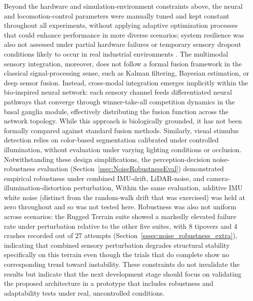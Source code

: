 Beyond the hardware and simulation-environment constraints above, the neural and locomotion-control parameters were manually tuned and kept constant throughout all experiments, without applying adaptive optimization processes that could enhance performance in more diverse scenarios; system resilience was also not assessed under partial hardware failures or temporary sensory dropout conditions likely to occur in real industrial environments . The multimodal sensory integration, moreover, does not follow a formal fusion framework in the classical signal-processing sense, such as Kalman filtering, Bayesian estimation, or deep sensor fusion. Instead, cross-modal integration emerges implicitly within the bio-inspired neural network: each sensory channel feeds differentiated neural pathways that converge through winner-take-all competition dynamics in the basal ganglia module, effectively distributing the fusion function across the network topology. While this approach is biologically grounded, it has not been formally compared against standard fusion methods. Similarly, visual stimulus detection relies on color-based segmentation calibrated under controlled illumination, without evaluation under varying lighting conditions or occlusion. Notwithstanding these design simplifications, the perception-decision noise-robustness evaluation (Section~\ref{ssec:NoiseRobustnessEval}) demonstrated empirical robustness under combined IMU-drift, LiDAR-noise, and camera-illumination-distortion perturbation,  Within the same evaluation, additive IMU white noise (distinct from the random-walk drift that was exercised) was held at zero throughout and so was not tested here. Robustness was also not uniform across scenarios: the Rugged Terrain suite showed a markedly elevated failure rate under perturbation relative to the other five suites, with 8 tipovers and 4 crashes recorded out of 27 attempts (Section~\ref{sssec:noise_robustness_extra}), indicating that combined sensory perturbation degrades structural stability specifically on this terrain even though the trials that do complete show no corresponding trend toward instability. These constraints do not invalidate the results but indicate that the next development stage should focus on validating the proposed architecture in a prototype that includes robustness and adaptability tests under real, uncontrolled conditions.

